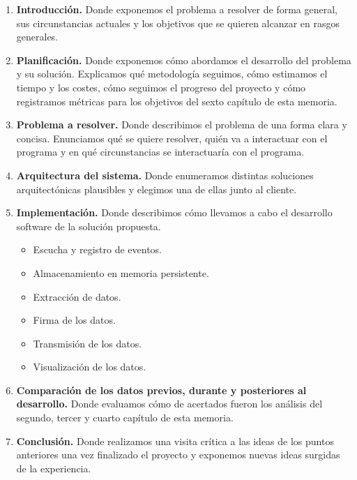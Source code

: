 \begin{enumerate}
    \item \textbf{Introducción.} Donde exponemos el problema a resolver de forma general,
    sus circunstancias actuales y los objetivos que se quieren alcanzar en rasgos generales.

    \item \textbf{Planificación.} Donde exponemos cómo abordamos el desarrollo del problema y su solución.
    Explicamos qué metodología seguimos, cómo estimamos el tiempo y los costes, cómo seguimos el progreso
    del proyecto y cómo registramos métricas para los objetivos del sexto capítulo de esta memoria.

    \item \textbf{Problema a resolver.} Donde describimos el problema de una forma clara y concisa.
    Enunciamos qué se quiere resolver, quién va a interactuar con el programa y en qué circunstancias
    se interactuaría con el programa.

    \item \textbf{Arquitectura del sistema.} Donde enumeramos distintas soluciones arquitectónicas
    plausibles y elegimos una de ellas junto al cliente.

    \item \textbf{Implementación.} Donde describimos cómo llevamos a cabo el desarrollo software
    de la solución propuesta.
    \begin{itemize}
        \item Escucha y registro de eventos.
        \item Almacenamiento en memoria persistente.
        \item Extracción de datos.
        \item Firma de los datos.
        \item Transmisión de los datos.
        \item Visualización de los datos.
    \end{itemize}

    \item \textbf{Comparación de los datos previos, durante y posteriores al desarrollo.} Donde evaluamos cómo de
    acertados fueron los análisis del segundo, tercer y cuarto capítulo de esta memoria.

    \item \textbf{Conclusión.} Donde realizamos una visita crítica a las ideas de los puntos
    anteriores una vez finalizado el proyecto y exponemos nuevas ideas surgidas de la experiencia.
\end{enumerate}
